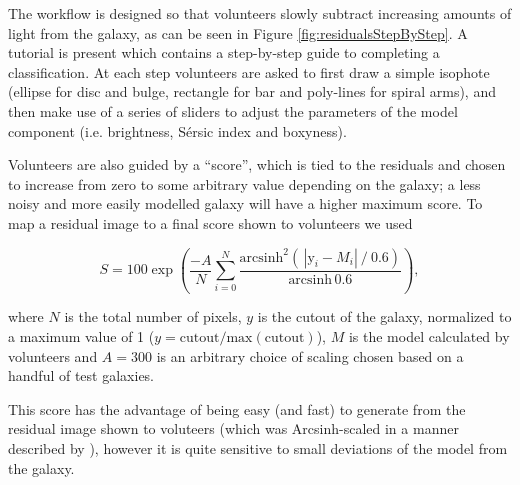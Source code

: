\documentclass[../main.tex]{subfiles}
\begin{document}
The workflow is designed so that volunteers slowly subtract increasing amounts of light from the galaxy, as can be seen in Figure \ref{fig:residualsStepByStep}. A tutorial is present which contains a step-by-step guide to completing a classification. At each step volunteers are asked to first draw a simple isophote (ellipse for disc and bulge, rectangle for bar and poly-lines for spiral arms), and then make use of a series of sliders to adjust the parameters of the model component (i.e. brightness, S\'ersic index and boxyness).

Volunteers are also guided by a ``score'', which is tied to the residuals and chosen to increase from zero to some arbitrary value depending on the galaxy; a less noisy and more easily modelled galaxy will have a higher maximum score. To map a residual image to a final score shown to volunteers we used

\begin{equation}
  \label{eq:gal_score}
    S = 100 \exp\left(\frac{-A}{N}\sum_{i=0}^N\frac{\text{arcsinh}^2\left(\,|\text{y}_i - M_i|\ /\ 0.6\right)}{\text{arcsinh}\,0.6 }\right),
\end{equation}

where $N$ is the total number of pixels, $y$ is the cutout of the galaxy, normalized to a maximum value of 1 ($y = \text{cutout}/\text{max}(\text{cutout})$), $M$ is the model calculated by volunteers and $A=300$ is an arbitrary choice of scaling chosen based on a handful of test galaxies.

This score has the advantage of being easy (and fast) to generate from the residual image shown to voluteers (which was Arcsinh-scaled in a manner described by \citealt{Lupton2003:astro-ph/0312483v1}), however it is quite sensitive to small deviations of the model from the galaxy.

\end{document}
